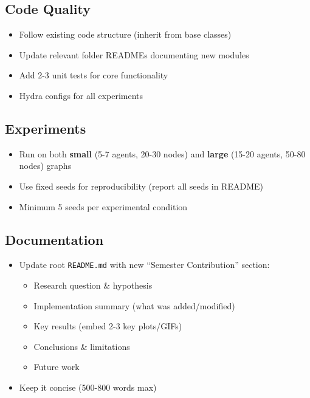 \documentclass[11pt,a4paper]{scrartcl}
\begin{document}
\begin{tcolorbox}[modern]
\subsection*{Code Quality}
\begin{itemize}[leftmargin=1.2em, itemsep=4pt]
    \item Follow existing code structure (inherit from base classes)
    \item Update relevant folder READMEs documenting new modules
    \item Add 2-3 unit tests for core functionality
    \item Hydra configs for all experiments
\end{itemize}

\subsection*{Experiments}
\begin{itemize}[leftmargin=1.2em, itemsep=4pt]
    \item Run on both \textbf{small} (5-7 agents, 20-30 nodes) and \textbf{large} (15-20 agents, 50-80 nodes) graphs
    \item Use fixed seeds for reproducibility (report all seeds in README)
    \item Minimum 5 seeds per experimental condition
\end{itemize}

\subsection*{Documentation}
\begin{itemize}[leftmargin=1.2em, itemsep=4pt]
    \item Update root \texttt{README.md} with new ``Semester Contribution'' section:
    \begin{itemize}[itemsep=2pt]
        \item Research question \& hypothesis
        \item Implementation summary (what was added/modified)
        \item Key results (embed 2-3 key plots/GIFs)
        \item Conclusions \& limitations
        \item Future work
    \end{itemize}
    \item Keep it concise (500-800 words max)
\end{itemize}
    \end{tcolorbox}
\end{document}
